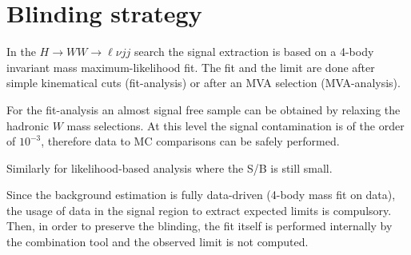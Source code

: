 \appendix
\section{Blinding strategy}
\label{sec:Blinding}

In the $H\rightarrow WW \rightarrow \ell{}\nu{}jj$ search the signal extraction 
is based on a 4-body invariant mass maximum-likelihood fit. The fit and the limit are done after simple
kinematical cuts (fit-analysis) or after an MVA selection (MVA-analysis).

For the fit-analysis an almost signal free sample can be obtained by relaxing the
hadronic $W$ mass selections. At this level the signal contamination is of the order of
$10^{-3}$, therefore data to MC comparisons can be safely performed.

Similarly for likelihood-based analysis where the S/B is still small.

Since the background estimation is fully data-driven (4-body mass fit on data),
the usage of data in the signal region to extract expected limits is compulsory.
Then, in order to preserve the blinding, the fit itself is performed internally by the
combination tool and the observed limit is not computed.